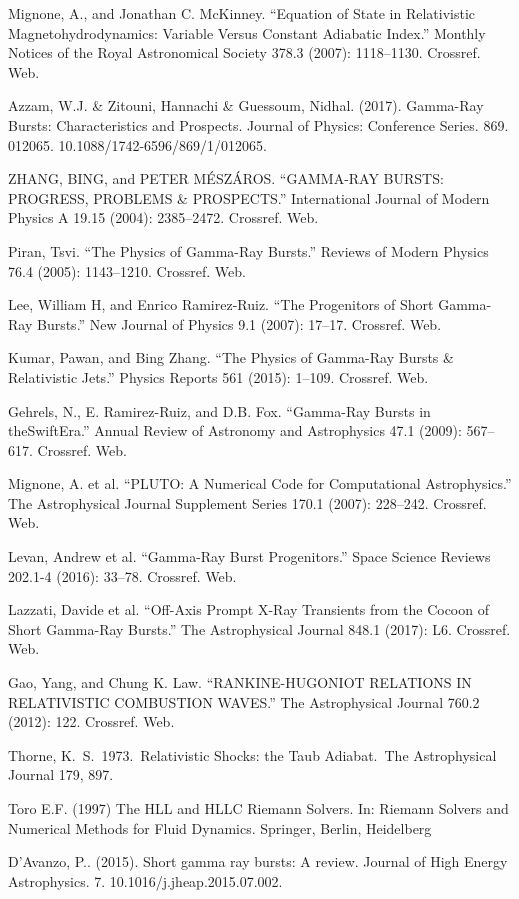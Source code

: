 \documentclass[12pt,a4paper]{book}
\begin{document}
\begin{thebibliography}{20}
Mignone, A., and Jonathan C. McKinney. “Equation of State in Relativistic Magnetohydrodynamics: Variable Versus Constant Adiabatic Index.” Monthly Notices of the Royal Astronomical Society 378.3 (2007): 1118–1130. Crossref. Web.

Azzam, W.J. \& Zitouni, Hannachi \& Guessoum, Nidhal. (2017). Gamma-Ray Bursts: Characteristics and Prospects. Journal of Physics: Conference Series. 869. 012065. 10.1088/1742-6596/869/1/012065. 

ZHANG, BING, and PETER MÉSZÁROS. “GAMMA-RAY BURSTS: PROGRESS, PROBLEMS \& PROSPECTS.” International Journal of Modern Physics A 19.15 (2004): 2385–2472. Crossref. Web.

Piran, Tsvi. “The Physics of Gamma-Ray Bursts.” Reviews of Modern Physics 76.4 (2005): 1143–1210. Crossref. Web.

Lee, William H, and Enrico Ramirez-Ruiz. “The Progenitors of Short Gamma-Ray Bursts.” New Journal of Physics 9.1 (2007): 17–17. Crossref. Web.

Kumar, Pawan, and Bing Zhang. “The Physics of Gamma-Ray Bursts \& Relativistic Jets.” Physics Reports 561 (2015): 1–109. Crossref. Web.

Gehrels, N., E. Ramirez-Ruiz, and D.B. Fox. “Gamma-Ray Bursts in theSwiftEra.” Annual Review of Astronomy and Astrophysics 47.1 (2009): 567–617. Crossref. Web.

Mignone, A. et al. “PLUTO: A Numerical Code for Computational Astrophysics.” The Astrophysical Journal Supplement Series 170.1 (2007): 228–242. Crossref. Web.

Levan, Andrew et al. “Gamma-Ray Burst Progenitors.” Space Science Reviews 202.1-4 (2016): 33–78. Crossref. Web.

Lazzati, Davide et al. “Off-Axis Prompt X-Ray Transients from the Cocoon of Short Gamma-Ray Bursts.” The Astrophysical Journal 848.1 (2017): L6. Crossref. Web.

Gao, Yang, and Chung K. Law. “RANKINE-HUGONIOT RELATIONS IN RELATIVISTIC COMBUSTION WAVES.” The Astrophysical Journal 760.2 (2012): 122. Crossref. Web.

 Thorne, K.~S.\ 1973.\ Relativistic Shocks: the Taub Adiabat.\ The Astrophysical Journal 179, 897.

Toro E.F. (1997) The HLL and HLLC Riemann Solvers. In: Riemann Solvers and Numerical Methods for Fluid Dynamics. Springer, Berlin, Heidelberg

D'Avanzo, P.. (2015). Short gamma ray bursts: A review. Journal of High Energy Astrophysics. 7. 10.1016/j.jheap.2015.07.002. 
\end{thebibliography}
\end{document}
